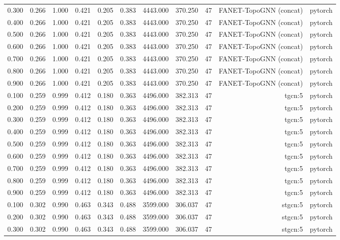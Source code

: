 \begin{tabular}{lrrrrrrrrrr}
0.300 & 0.266 & 1.000 & 0.421 & 0.205 & 0.383 & 4443.000 & 370.250 & 47 & FANET-TopoGNN (concat) & pytorch \\
0.400 & 0.266 & 1.000 & 0.421 & 0.205 & 0.383 & 4443.000 & 370.250 & 47 & FANET-TopoGNN (concat) & pytorch \\
0.500 & 0.266 & 1.000 & 0.421 & 0.205 & 0.383 & 4443.000 & 370.250 & 47 & FANET-TopoGNN (concat) & pytorch \\
0.600 & 0.266 & 1.000 & 0.421 & 0.205 & 0.383 & 4443.000 & 370.250 & 47 & FANET-TopoGNN (concat) & pytorch \\
0.700 & 0.266 & 1.000 & 0.421 & 0.205 & 0.383 & 4443.000 & 370.250 & 47 & FANET-TopoGNN (concat) & pytorch \\
0.800 & 0.266 & 1.000 & 0.421 & 0.205 & 0.383 & 4443.000 & 370.250 & 47 & FANET-TopoGNN (concat) & pytorch \\
0.900 & 0.266 & 1.000 & 0.421 & 0.205 & 0.383 & 4443.000 & 370.250 & 47 & FANET-TopoGNN (concat) & pytorch \\
0.100 & 0.259 & 0.999 & 0.412 & 0.180 & 0.363 & 4496.000 & 382.313 & 47 & tgcn:5 & pytorch \\
0.200 & 0.259 & 0.999 & 0.412 & 0.180 & 0.363 & 4496.000 & 382.313 & 47 & tgcn:5 & pytorch \\
0.300 & 0.259 & 0.999 & 0.412 & 0.180 & 0.363 & 4496.000 & 382.313 & 47 & tgcn:5 & pytorch \\
0.400 & 0.259 & 0.999 & 0.412 & 0.180 & 0.363 & 4496.000 & 382.313 & 47 & tgcn:5 & pytorch \\
0.500 & 0.259 & 0.999 & 0.412 & 0.180 & 0.363 & 4496.000 & 382.313 & 47 & tgcn:5 & pytorch \\
0.600 & 0.259 & 0.999 & 0.412 & 0.180 & 0.363 & 4496.000 & 382.313 & 47 & tgcn:5 & pytorch \\
0.700 & 0.259 & 0.999 & 0.412 & 0.180 & 0.363 & 4496.000 & 382.313 & 47 & tgcn:5 & pytorch \\
0.800 & 0.259 & 0.999 & 0.412 & 0.180 & 0.363 & 4496.000 & 382.313 & 47 & tgcn:5 & pytorch \\
0.900 & 0.259 & 0.999 & 0.412 & 0.180 & 0.363 & 4496.000 & 382.313 & 47 & tgcn:5 & pytorch \\
0.100 & 0.302 & 0.990 & 0.463 & 0.343 & 0.488 & 3599.000 & 306.037 & 47 & stgcn:5 & pytorch \\
0.200 & 0.302 & 0.990 & 0.463 & 0.343 & 0.488 & 3599.000 & 306.037 & 47 & stgcn:5 & pytorch \\
0.300 & 0.302 & 0.990 & 0.463 & 0.343 & 0.488 & 3599.000 & 306.037 & 47 & stgcn:5 & pytorch \\

\end{tabular}
